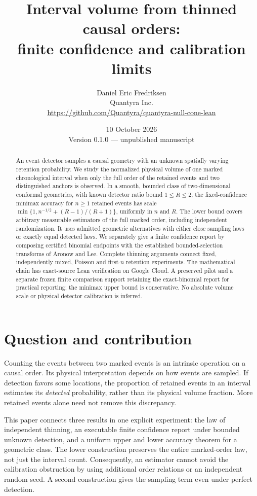 \documentclass[11pt]{article}
\title{Interval volume from thinned causal orders:\\finite confidence and calibration limits}
\author{Daniel Eric Fredriksen\\Quantyra Inc.\\
\url{https://github.com/Quantyra/quantyra-null-cone-lean}}
\date{10 October 2026\\Version 0.1.0 --- unpublished manuscript}
\theoremstyle{remark}
\begin{document}
\maketitle
\begin{abstract}
An event detector samples a causal geometry with an unknown spatially
varying retention probability. We study the normalized physical volume of
one marked chronological interval when only the full order of the retained
events and two distinguished anchors is observed. In a smooth, bounded
class of two-dimensional conformal geometries, with known detector ratio
bound $1\le R\le2$, the fixed-confidence minimax accuracy for $n\ge1$
retained events has scale
$\min\{1,n^{-1/2}+(R-1)/(R+1)\}$, uniformly in $n$ and $R$.
The lower bound covers arbitrary measurable estimators of the full marked
order, including independent randomization. It uses admitted geometric
alternatives with either close sampling laws or exactly equal detected
laws. We separately give a finite confidence report by composing certified
binomial endpoints with the established bounded-selection transforms of
Aronow and Lee. Complete thinning arguments connect fixed, independently
mixed, Poisson and first-$n$ retention experiments. The mathematical chain
has exact-source Lean verification on Google Cloud. A preserved pilot and
a separate frozen finite comparison support retaining the exact-binomial
report for practical reporting; the minimax upper bound is conservative.
No absolute volume scale or physical detector calibration is inferred.
\end{abstract}

\section{Question and contribution}
Counting the events between two marked events is an intrinsic operation on
a causal order. Its physical interpretation depends on how events are
sampled. If detection favors some locations, the proportion of retained
events in an interval estimates its \emph{detected} probability, rather
than its physical volume fraction. More retained events alone need not
remove this discrepancy.

This paper connects three results in one explicit experiment: the law of
independent thinning, an executable finite confidence report under bounded
unknown detection, and a uniform upper and lower accuracy theorem for a
geometric class. The lower construction preserves the entire marked-order
law, not just the interval count. Consequently, an estimator cannot avoid
the calibration obstruction by using additional order relations or an
independent random seed. A second construction gives the sampling term
even under perfect detection.
\end{document}
